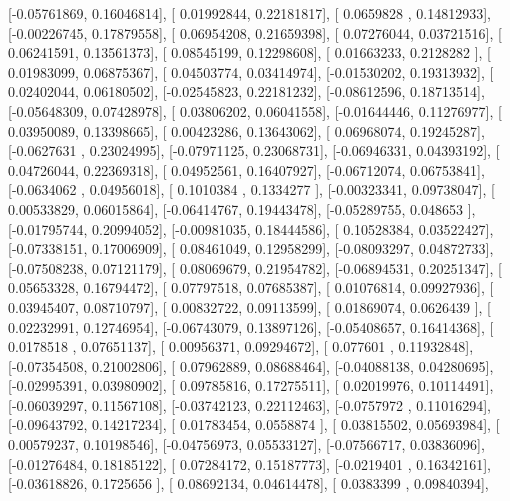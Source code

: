 \documentclass{article}
\begin{document}
       [-0.05761869,  0.16046814],
       [ 0.01992844,  0.22181817],
       [ 0.0659828 ,  0.14812933],
       [-0.00226745,  0.17879558],
       [ 0.06954208,  0.21659398],
       [ 0.07276044,  0.03721516],
       [ 0.06241591,  0.13561373],
       [ 0.08545199,  0.12298608],
       [ 0.01663233,  0.2128282 ],
       [ 0.01983099,  0.06875367],
       [ 0.04503774,  0.03414974],
       [-0.01530202,  0.19313932],
       [ 0.02402044,  0.06180502],
       [-0.02545823,  0.22181232],
       [-0.08612596,  0.18713514],
       [-0.05648309,  0.07428978],
       [ 0.03806202,  0.06041558],
       [-0.01644446,  0.11276977],
       [ 0.03950089,  0.13398665],
       [ 0.00423286,  0.13643062],
       [ 0.06968074,  0.19245287],
       [-0.0627631 ,  0.23024995],
       [-0.07971125,  0.23068731],
       [-0.06946331,  0.04393192],
       [ 0.04726044,  0.22369318],
       [ 0.04952561,  0.16407927],
       [-0.06712074,  0.06753841],
       [-0.0634062 ,  0.04956018],
       [ 0.1010384 ,  0.1334277 ],
       [-0.00323341,  0.09738047],
       [ 0.00533829,  0.06015864],
       [-0.06414767,  0.19443478],
       [-0.05289755,  0.048653  ],
       [-0.01795744,  0.20994052],
       [-0.00981035,  0.18444586],
       [ 0.10528384,  0.03522427],
       [-0.07338151,  0.17006909],
       [ 0.08461049,  0.12958299],
       [-0.08093297,  0.04872733],
       [-0.07508238,  0.07121179],
       [ 0.08069679,  0.21954782],
       [-0.06894531,  0.20251347],
       [ 0.05653328,  0.16794472],
       [ 0.07797518,  0.07685387],
       [ 0.01076814,  0.09927936],
       [ 0.03945407,  0.08710797],
       [ 0.00832722,  0.09113599],
       [ 0.01869074,  0.0626439 ],
       [ 0.02232991,  0.12746954],
       [-0.06743079,  0.13897126],
       [-0.05408657,  0.16414368],
       [ 0.0178518 ,  0.07651137],
       [ 0.00956371,  0.09294672],
       [ 0.077601  ,  0.11932848],
       [-0.07354508,  0.21002806],
       [ 0.07962889,  0.08688464],
       [-0.04088138,  0.04280695],
       [-0.02995391,  0.03980902],
       [ 0.09785816,  0.17275511],
       [ 0.02019976,  0.10114491],
       [-0.06039297,  0.11567108],
       [-0.03742123,  0.22112463],
       [-0.0757972 ,  0.11016294],
       [-0.09643792,  0.14217234],
       [ 0.01783454,  0.0558874 ],
       [ 0.03815502,  0.05693984],
       [ 0.00579237,  0.10198546],
       [-0.04756973,  0.05533127],
       [-0.07566717,  0.03836096],
       [-0.01276484,  0.18185122],
       [ 0.07284172,  0.15187773],
       [-0.0219401 ,  0.16342161],
       [-0.03618826,  0.1725656 ],
       [ 0.08692134,  0.04614478],
       [ 0.0383399 ,  0.09840394],
\end{document}
